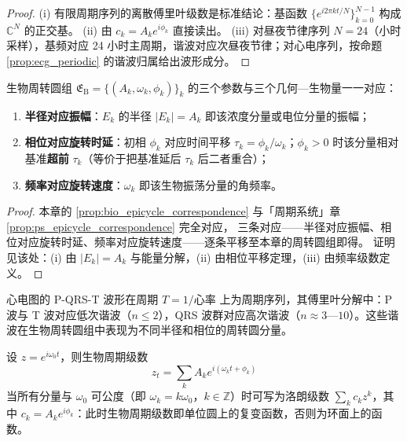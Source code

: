 \begin{proof}
(i) 有限周期序列的离散傅里叶级数是标准结论：基函数 $\{e^{i2\pi kt/N}\}_{k=0}^{N-1}$ 构成 $\mathbb C^N$ 的正交基。
(ii) 由 $c_k=A_k e^{i\phi_k}$ 直接读出。
(iii) 对昼夜节律序列 $N=24$（小时采样），基频对应 24 小时主周期，谐波对应次昼夜节律；对心电序列，按命题 \ref{prop:ecg_periodic} 的谐波归属给出波形成分。
\end{proof}

\begin{proposition}\label{prop:bio_epicycle_correspondence}
生物周转圆组 $\mathfrak E_{\mathrm{B}}=\{(A_k,\omega_k,\phi_k)\}_{k}$ 的三个参数与三个几何—生物量一一对应：
\begin{enumerate}[label=(\roman*)]
    \item \textbf{半径对应振幅}：$E_k$ 的半径 $|E_k|=A_k$ 即该浓度分量或电位分量的振幅；
    \item \textbf{相位对应旋转时延}：初相 $\phi_k$ 对应时间平移 $\tau_k=\phi_k/\omega_k$；$\phi_k>0$ 时该分量相对基准\textbf{超前} $\tau_k$（等价于把基准延后 $\tau_k$ 后二者重合）；
    \item \textbf{频率对应旋转速度}：$\omega_k$ 即该生物振荡分量的角频率。
\end{enumerate}
\end{proposition}

\begin{proof}
本章的 \cref{prop:bio_epicycle_correspondence} 与「周期系统」章 \cref{prop:ps_epicycle_correspondence} 完全对应，
三条对应——半径对应振幅、相位对应旋转时延、频率对应旋转速度——逐条平移至本章的周转圆组即得。
证明见该处：(i) 由 $|E_k|=A_k$ 与能量分解，(ii) 由相位平移定理，(iii) 由频率级数定义。
\end{proof}

\begin{example}[心电图的周期级数]\label{ex:bio_ecg_series}
心电图的 P-QRS-T 波形在周期 $T=1/\text{心率}$ 上为周期序列，其傅里叶分解中：P 波与 T 波对应低次谐波（$n\le 2$），QRS 波群对应高次谐波（$n\approx 3$—$10$）。这些谐波在生物周转圆组中表现为不同半径和相位的周转圆分量。
\end{example}

\begin{remark}[周期级数即复变函数]\label{rem:bio_series_complex}
设 $z=e^{i\omega_0t}$，则生物周期级数
\[
z_t=\sum_k A_k e^{i(\omega_k t+\phi_k)}
\]
当所有分量与 $\omega_0$ 可公度（即 $\omega_k=k\omega_0$，$k\in\mathbb Z$）时可写为洛朗级数 $\sum_k c_k z^k$，其中 $c_k=A_k e^{i\phi_k}$：此时生物周期级数即单位圆上的复变函数，否则为环面上的函数。
\end{remark}

